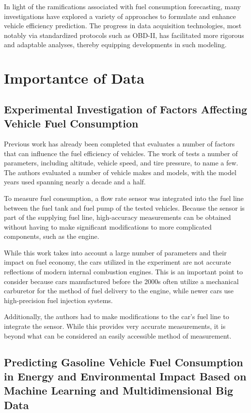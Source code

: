\documentclass[letterpaper]{article}
\begin{document}
In light of the ramifications associated with fuel consumption forecasting, many
investigations have explored a variety of approaches to formulate and enhance
vehicle efficiency prediction. The progress in data acquisition technologies,
most notably via standardized protocols such as OBD-II, has facilitated more
rigorous and adaptable analyses, thereby equipping developments in such modeling.

\section*{Importantce of Data}

\subsection*{Experimental Investigation of Factors Affecting Vehicle Fuel Consumption}

Previous work has already been completed that evaluates a number of factors that
can influence the fuel efficiency of vehicles. The work of \cite{al2007experimental}
tests a number of parameters, including altitude, vehicle speed, and
tire pressure, to name a few. The authors evaluated a number of vehicle makes
and models, with the model years used spanning nearly a decade and a half. 

To measure fuel consumption, a flow rate sensor was integrated into the fuel line
between the fuel tank and fuel pump of the tested vehicles. Because the sensor
is part of the supplying fuel line, high-accuracy measurements can be obtained
without having to make significant modifications to more complicated components,
such as the engine. 

While this work takes into account a large number of
parameters and their impact on fuel economy, the cars utilized in the experiment
are not accurate reflections of modern internal combustion engines. This is an
important point to consider because cars manufactured before the 2000s often
utilize a mechanical carburetor for the method of fuel delivery to the engine,
while newer cars use high-precision fuel injection systems. 

Additionally, the
authors had to make modifications to the car's fuel line to integrate the sensor.
While this provides very accurate measurements, it is beyond what can be
considered an easily accessible method of measurement.

\subsection*{Predicting Gasoline Vehicle Fuel Consumption in Energy and Environmental 
Impact Based on Machine Learning and Multidimensional Big Data}
\end{document}

